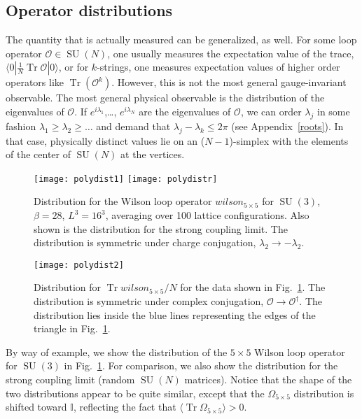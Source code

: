\documentclass[preprint,aps,prd]{revtex4-2}
\newcommand\wilson[2]{\Omega_{#1 \times #2}}
\DeclareMathOperator{\SU}{SU}
\DeclareMathOperator{\Tr}{Tr}
\begin{document}
\subsection{Operator distributions}

The quantity that is actually measured can be generalized, as well.
For some loop operator $\mathcal{O}\in\SU(N)$, one usually
measures the expectation value of the trace,
$\langle 0 | \frac{1}{N} \Tr \mathcal{O} |0\rangle$, or for $k$-strings,
one measures expectation values of higher order operators
like $\Tr\left( \mathcal{O}^k\right)$.
However, this is not the most general gauge-invariant observable.
The most general physical observable is the distribution of the
eigenvalues of $\mathcal{O}$.  If $e^{i\lambda_1}$,\ldots, $e^{i\lambda_N}$
are the eigenvalues of $\mathcal{O}$, we can order $\lambda_j$ in
some fashion $\lambda_1\ge \lambda_2 \ge \ldots$ and demand that
$\lambda_j-\lambda_k\le 2\pi$ (see Appendix~\ref{roots}).
In that case, physically
distinct values lie on an ($N-1$)-simplex with the elements of the
center of $\SU(N)$ at the vertices.

\begin{figure}
  \texttt{[image: polydist1]}
  \texttt{[image: polydistr]}
  \caption{Distribution for the Wilson loop operator
    $wilson_{5\times 5}$ for $\SU(3)$, $\beta=28$, $L^3=16^3$,
    averaging over 100 lattice configurations.
    Also shown is the distribution for the strong coupling limit.
    The distribution is
    symmetric under charge conjugation,
    $\lambda_2 \to -\lambda_2$.
   \label{polydist1}}
\end{figure}
\begin{figure}
  \texttt{[image: polydist2]}
  \caption{Distribution for $\Tr wilson_{5\times 5}/N$  for
    the data shown in Fig.~\ref{polydist1}.  
    The distribution is symmetric under complex conjugation,
    $\mathcal{O}\to\mathcal{O}^\dagger$.
    The distribution lies inside the blue lines representing
    the edges of the triangle in Fig.~\ref{polydist1}.
    \label{polydist2}}
\end{figure}

By way of example, we show the distribution of the
$5\times5$ Wilson loop operator for $\SU(3)$ in Fig.~\ref{polydist1}.
For comparison, we also show the distribution for
the strong coupling limit (random $\SU(N)$ matrices).
Notice that the shape of the two distributions appear to
be quite similar, except that the $\wilson{5}{5}$ distribution
is shifted toward $\mathbb{I}$, reflecting the fact that
$\langle\Tr \wilson{5}{5}\rangle >0$.
\end{document}
